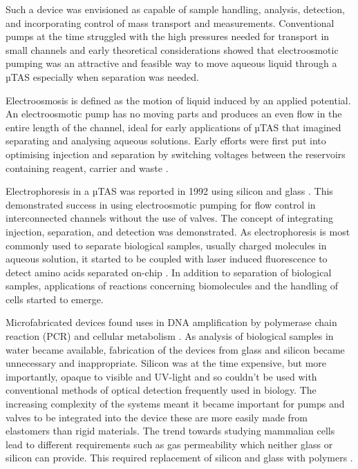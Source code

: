 Such a device was envisioned as capable of sample handling, analysis, detection, and incorporating control of
mass transport and measurements. Conventional pumps at the time struggled with the high pressures needed for transport
in small channels and early theoretical considerations showed that electroosmotic pumping was an attractive and
feasible way to move aqueous liquid through a µTAS especially when separation was needed.

Electroosmosis is defined as the motion of liquid induced by an applied potential. An electroosmotic pump
has no moving parts and produces an even flow in the entire length of the channel, ideal for early applications
of µTAS that imagined separating and analysing aqueous solutions. Early efforts were first put into optimising
injection and separation by switching voltages between the reservoirs containing reagent, carrier and
waste \citep{manz1991integrated}.

Electrophoresis in a µTAS was reported in 1992 using silicon and glass \citep{harrison1992capillary}. This
demonstrated success in using electroosmotic pumping for flow control in interconnected channels without the
use of valves. The concept of integrating injection, separation, and detection was demonstrated. As electrophoresis
is most commonly used to separate biological samples, usually charged molecules in aqueous solution, it started to be
coupled with laser induced fluorescence to detect amino acids separated on-chip \citep{seiler1993planar}. In
addition to separation of biological samples, applications of reactions concerning biomolecules and the
handling of cells started to emerge.

Microfabricated devices found uses in DNA amplification by polymerase chain reaction
(PCR) \citep{woolley1996functional} and cellular metabolism \citep{bousse1994micromachined}.
As analysis of biological samples in water became available, fabrication of the devices
from glass and silicon became unnecessary and inappropriate. Silicon was at the time expensive, but more
importantly, opaque to visible and UV-light and so couldn't be used with conventional methods of optical
detection frequently used in biology. The increasing complexity of the systems meant it became
important for pumps and valves to be integrated into the device these are more easily made from elastomers
than rigid materials. The trend towards studying mammalian cells lead to different requirements such as gas
permeability which neither glass or silicon can provide. This required replacement of silicon and glass with
polymers \citep{RN5}.

